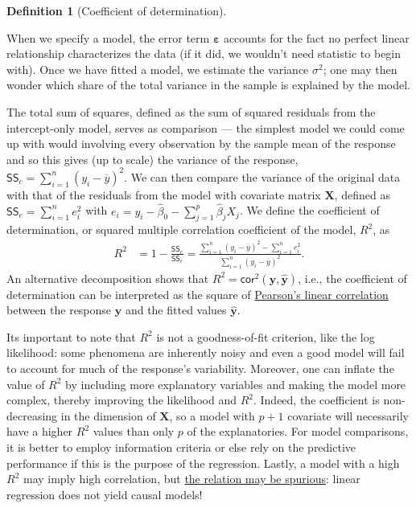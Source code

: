 \documentclass[
  11pt,
  letterpaper,
]{scrbook}
\theoremstyle{definition}
\newtheorem{definition}{Definition}[chapter]
\theoremstyle{definition}
\theoremstyle{plain}
\theoremstyle{plain}
\theoremstyle{remark}
\begin{document}
\begin{definition}[Coefficient of
determination]\protect\hypertarget{def-r2}{}\label{def-r2}

When we specify a model, the error term \(\boldsymbol{\varepsilon}\)
accounts for the fact no perfect linear relationship characterizes the
data (if it did, we wouldn't need statistic to begin with). Once we have
fitted a model, we estimate the variance \(\sigma^2\); one may then
wonder which share of the total variance in the sample is explained by
the model.

The total sum of squares, defined as the sum of squared residuals from
the intercept-only model, serves as comparison --- the simplest model we
could come up with would involving every observation by the sample mean
of the response and so this gives (up to scale) the variance of the
response, \(\mathsf{SS}_c = \sum_{i=1}^n (y_i - \overline{y})^2\). We
can then compare the variance of the original data with that of the
residuals from the model with covariate matrix \(\mathbf{X}\), defined
as \(\mathsf{SS}_e =\sum_{i=1}^n e_i^2\) with
\(e_i = y_i - \widehat{\beta}_0 - \sum_{j=1}^p \widehat{\beta}_jX_j\).
We define the coefficient of determination, or squared multiple
correlation coefficient of the model, \(R^2\), as \begin{align*}
R^2 &=1- \frac{\mathsf{SS}_e}{\mathsf{SS}_c} = \frac{\sum_{i=1}^n (y_i - \overline{y})^2- \sum_{i=1}^n e_i^2}{\sum_{i=1}^n (y_i - \overline{y})^2}.
\end{align*} An alternative decomposition shows that
\(R^2 = \mathsf{cor}^2(\boldsymbol{y}, \widehat{\boldsymbol{y}})\),
i.e., the coefficient of determination can be interpreted as the square
of \href{moments}{Pearson's linear correlation} between the response
\(\boldsymbol{y}\) and the fitted values \(\widehat{\boldsymbol{y}}\).

\end{definition}

Its important to note that \(R^2\) is not a goodness-of-fit criterion,
like the log likelihood: some phenomena are inherently noisy and even a
good model will fail to account for much of the response's variability.
Moreover, one can inflate the value of \(R^2\) by including more
explanatory variables and making the model more complex, thereby
improving the likelihood and \(R^2\). Indeed, the coefficient is
non-decreasing in the dimension of \(\mathbf{X}\), so a model with
\(p+1\) covariate will necessarily have a higher \(R^2\) values than
only \(p\) of the explanatories. For model comparisons, it is better to
employ information criteria or else rely on the predictive performance
if this is the purpose of the regression. Lastly, a model with a high
\(R^2\) may imply high correlation, but
\href{http://www.tylervigen.com/spurious-correlations}{the relation may
be spurious}: linear regression does not yield causal models!
\end{document}
